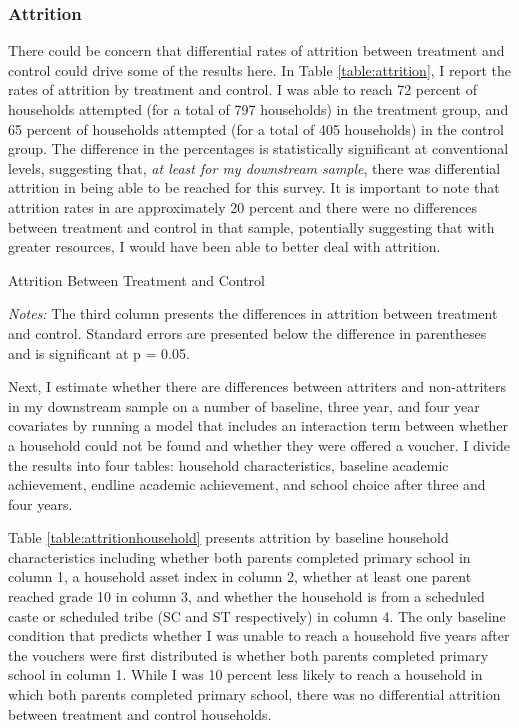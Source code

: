 \documentclass[hidelinks, 12pt, titlepage]{article}
\begin{document}
		\subsubsection{Attrition\label{appendix:attrition}}

			There could be concern that differential rates of attrition between treatment and control could drive some of the results here.  In Table \ref{table:attrition}, I report the rates of attrition by treatment and control.  I was able to reach 72 percent of households attempted (for a total of 797 households) in the treatment group, and 65 percent of households attempted (for a total of 405 households) in the control group.  The difference in the percentages is statistically significant at conventional levels, suggesting that, \emph{at least for my downstream sample}, there was differential attrition in being able to be reached for this survey.  It is important to note that attrition rates in \cite{Muralidharan2015} are approximately 20 percent and there were no differences between treatment and control in that sample, potentially suggesting that with greater resources, I would have been able to better deal with attrition.
			
			\begin{table}[hbtp!]
				\begin{threeparttable}
					\centering
					\caption{Attrition Between Treatment and Control\label{table:attrition}}
					
					\begin{tablenotes}
						\item \emph{Notes:} The third column presents the differences in attrition between treatment and control.  Standard errors are presented below the difference in parentheses and is significant at p = 0.05.
					\end{tablenotes}
				\end{threeparttable}
			\end{table}

			Next, I estimate whether there are differences between attriters and non-attriters in my downstream sample on a number of baseline, three year, and four year covariates by running a model that includes an interaction term between whether a household could not be found and whether they were offered a voucher.  I divide the results into four tables: household characteristics, baseline academic achievement, endline academic achievement, and school choice after three and four years.

			Table \ref{table:attritionhousehold} presents attrition by baseline household characteristics including whether both parents completed primary school in column 1, a household asset index in column 2, whether at least one parent reached grade 10 in column 3, and whether the household is from a scheduled caste or scheduled tribe (SC and ST respectively) in column 4.  The only baseline condition that predicts whether I was unable to reach a household five years after the vouchers were first distributed is whether both parents completed primary school in column 1.  While I was 10 percent less likely to reach a household in which both parents completed primary school, there was no differential attrition between treatment and control households.
\end{document}
